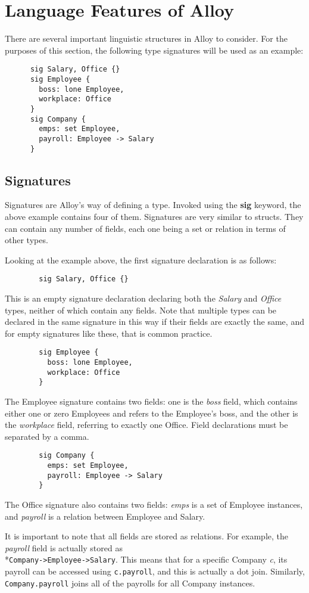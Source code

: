 \documentclass[10pt]{article}
\begin{document}
  \section*{Language Features of Alloy}
    There are several important linguistic structures in Alloy to consider. For the purposes of this section, the following type signatures will be used as an example:
    \begin{verbatim}
      sig Salary, Office {}
      sig Employee {
        boss: lone Employee,
        workplace: Office
      }
      sig Company {
        emps: set Employee,
        payroll: Employee -> Salary
      }
    \end{verbatim}
    \subsection*{Signatures}
      Signatures are Alloy's way of defining a type. Invoked using the \textbf{sig} keyword, the above example contains four of them. Signatures are very similar to structs. They can contain any number of fields, each one being a set or relation in terms of other types.\par
      Looking at the example above, the first signature declaration is as follows:
      \begin{verbatim}
        sig Salary, Office {}
      \end{verbatim}
      This is an empty signature declaration declaring both the \textit{Salary} and \textit{Office} types, neither of which contain any fields. Note that multiple types can be declared in the same signature in this way if their fields are exactly the same, and for empty signatures like these, that is common practice.
      \begin{verbatim}
        sig Employee {
          boss: lone Employee,
          workplace: Office
        }
      \end{verbatim}
      The Employee signature contains two fields: one is the \textit{boss} field, which contains either one or zero Employees and refers to the Employee's boss, and the other is the \textit{workplace} field, referring to exactly one Office. Field declarations must be separated by a comma.
      \begin{verbatim}
        sig Company {
          emps: set Employee,
          payroll: Employee -> Salary
        }
      \end{verbatim}
      The Office signature also contains two fields: \textit{emps} is a set of Employee instances, and \textit{payroll} is a relation between Employee and Salary.\par
      It is important to note that all fields are stored as relations. For example, the \textit{payroll} field is actually stored as\\*\lstinline|Company->Employee->Salary|. This means that for a specific Company \textit{c}, its payroll can be accessed using \lstinline|c.payroll|, and this is actually a dot join. Similarly, \lstinline|Company.payroll| joins all of the payrolls for all Company instances.
\end{document}
